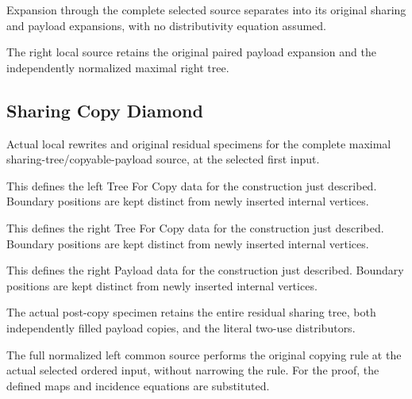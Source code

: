 Expansion through the complete selected source separates into its original sharing and payload expansions, with no distributivity equation assumed.
\par{}

The right local source retains the original paired payload expansion and the independently normalized maximal right tree.
\par{}

\subsection{Sharing Copy Diamond}
Actual local rewrites and original residual specimens for the complete maximal sharing-tree/copyable-payload source, at the selected first input.

This defines the left Tree For Copy data for the construction just described. Boundary positions are kept distinct from newly inserted internal vertices.
\par{}

This defines the right Tree For Copy data for the construction just described. Boundary positions are kept distinct from newly inserted internal vertices.
\par{}

This defines the right Payload data for the construction just described. Boundary positions are kept distinct from newly inserted internal vertices.
\par{}

The actual post-copy specimen retains the entire residual sharing tree, both independently filled payload copies, and the literal two-use distributors.
\par{}

The full normalized left common source performs the original copying rule at the actual selected ordered input, without narrowing the rule.
For the proof, the defined maps and incidence equations are substituted.
\par{}

